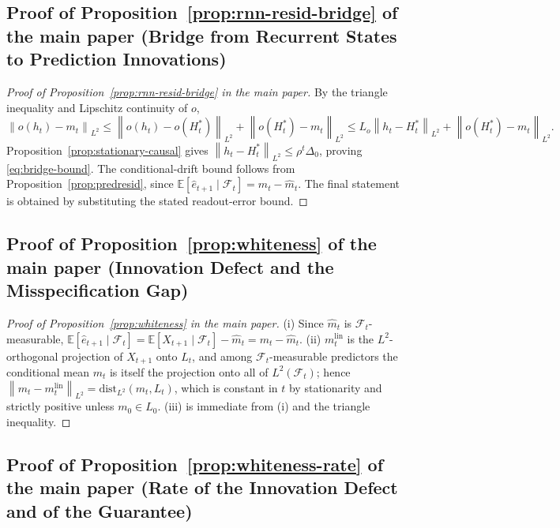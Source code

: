 \documentclass[bj,authoryear]{imsart}
\theoremstyle{plain}
\theoremstyle{definition}
\newcommand{\E}{\mathbb{E}}
\newcommand{\F}{\mathcal{F}}
\newcommand{\norm}[1]{\left\lVert #1 \right\rVert}
\newcommand{\given}{\mid}
\begin{document}
\subsection{Proof of Proposition~\ref{prop:rnn-resid-bridge} of the main paper (Bridge from Recurrent States to Prediction Innovations)}
\label{app:proof-bridge}

\begin{proof}[Proof of Proposition~\ref{prop:rnn-resid-bridge} in the main paper]
  By the triangle inequality and Lipschitz continuity of $o$,
  \[
    \norm{o(h_t)-m_t}_{L^2}
    \leq
    \norm{o(h_t)-o(H_t^*)}_{L^2}
    +
    \norm{o(H_t^*)-m_t}_{L^2}
    \leq
    L_o\norm{h_t-H_t^*}_{L^2}
    +
    \norm{o(H_t^*)-m_t}_{L^2}.
  \]
  Proposition~\ref{prop:stationary-causal} gives
  $\norm{h_t-H_t^*}_{L^2}\leq\rho^t\Delta_0$, proving
  \eqref{eq:bridge-bound}.  The conditional-drift bound follows from
  Proposition~\ref{prop:predresid}, since
  $\E[\hat e_{t+1}\given\F_t]=m_t-\hat m_t$.  The final statement is obtained
  by substituting the stated readout-error bound.
\end{proof}

\subsection{Proof of Proposition~\ref{prop:whiteness} of the main paper (Innovation Defect and the Misspecification Gap)}
\label{app:proof-whiteness}

\begin{proof}[Proof of Proposition~\ref{prop:whiteness} in the main paper]
  (i) Since $\hat m_t$ is $\F_t$-measurable,
  $\E[\hat e_{t+1}\given\F_t]=\E[X_{t+1}\given\F_t]-\hat m_t=m_t-\hat m_t$.
  (ii) $m_t^{\mathrm{lin}}$ is the $L^2$-orthogonal projection of $X_{t+1}$
  onto $L_t$, and among $\F_t$-measurable predictors the conditional mean
  $m_t$ is itself the projection onto all of $L^2(\F_t)$; hence
  $\norm{m_t-m_t^{\mathrm{lin}}}_{L^2}=\mathrm{dist}_{L^2}(m_t,L_t)$, which is
  constant in $t$ by stationarity and strictly positive unless $m_0\in L_0$.
  (iii) is immediate from (i) and the triangle inequality.
\end{proof}

\subsection{Proof of Proposition~\ref{prop:whiteness-rate} of the main paper (Rate of the Innovation Defect and of the Guarantee)}
\label{app:proof-whiteness-rate}
\end{document}
